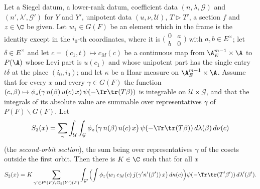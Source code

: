\begin{lemma}\label{pf:tlift:unf}
Let a Siegel datum, a lower-rank datum, coefficient data $(n,\lambda,\mathcal G)$ and $(n',\lambda',\mathcal G')$ for $Y$ and $Y'$,
unipotent data $(u,\nu,\mathcal U)$, $T\rhd T'$, a section $f$ and $z\in\C$ be given. Let $w_1\in G(F)$ be an element which in
the frame is the identity except in the $i_0$-th coordinates, where it is $\bigl(\begin{smallmatrix}0&a\\ b&0\end{smallmatrix}\bigr)$ with
$a,b\in E^\times$; let $\delta\in E^\times$ and let $c=(c_1,t)\mapsto c_M(c)$ be a continuous map from $\tliftAE^{m-1}\times\A$ to
$P(\A)$ whose Levi part is $u(c_1)$ and whose unipotent part has the single entry $t\delta$ at the place $(i_0,i_0)$; and
let $\kappa$ be a Haar measure on $\tliftAE^{m-1}\times\A$. Assume that for every $x$ and every $\gamma\in G(F)$ the function
$(c,\beta)\mapsto\phi_z(\gamma\,n(\beta)\,u(c)\,x)\,\psi(-\Tr\tr(T\beta))$ is integrable on $\mathcal U\times\mathcal G$, and that the integrals of its absolute
value are summable over representatives $\gamma$ of $P(F)\backslash G(F)$. Let
\[
  S_2(x)=\sum_{\gamma}\int_{\mathcal U}\int_{\mathcal G}\phi_z\bigl(\gamma\,n(\beta)\,u(c)\,x\bigr)\,\psi(-\Tr\tr(T\beta))\,d\lambda(\beta)\,d\nu(c)
\]
(the \emph{second-orbit section}), the sum being over representatives $\gamma$ of the cosets outside the first orbit.
Then there is $K\in\C$ such that for all $x$
\[
  S_2(x)=K\sum_{\gamma'\in P'(F)\backslash G_2(Y')(F)}\int_{\mathcal G'}\Bigl(\int\phi_z\bigl(w_1\,c_M(c)\,j(\gamma'n'(\beta'))\,x\bigr)\,d\kappa(c)\Bigr)
  \psi(-\Tr\tr(T'\beta'))\,d\lambda'(\beta').
\]
\end{lemma}

